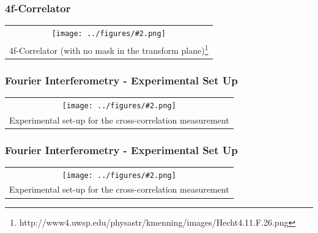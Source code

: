 \documentclass{beamer}
\newcommand{\gra}[3][]{
	\begin{table}
	\centering
	\begin{tabular}[width=\textwidth]{c}
		\texttt{[image: ../figures/\#2.png]}\\
		\small #3
	\end{tabular}
	\end{table}
}
\begin{document}
\begin{frame}
	\frametitle{4f-Correlator}
	\gra[0.8]{Correlator}{4f-Correlator (with no mask in the transform plane)\footnote{http://www4.uwsp.edu/physastr/kmenning/images/Hecht4.11.F.26.png}} 
\end{frame}

\begin{frame}
	\frametitle{Fourier Interferometry - Experimental Set Up}
   \gra[0.8]{Versuchsaufbau_4}{Experimental set-up for the cross-correlation measurement  \footfullcite{Bamberger}}
\end{frame}
\begin{frame}
	\frametitle{Fourier Interferometry - Experimental Set Up}
	\gra[0.8]{aufbau4}{Experimental set-up for the cross-correlation measurement}
\end{frame}
\end{document}

